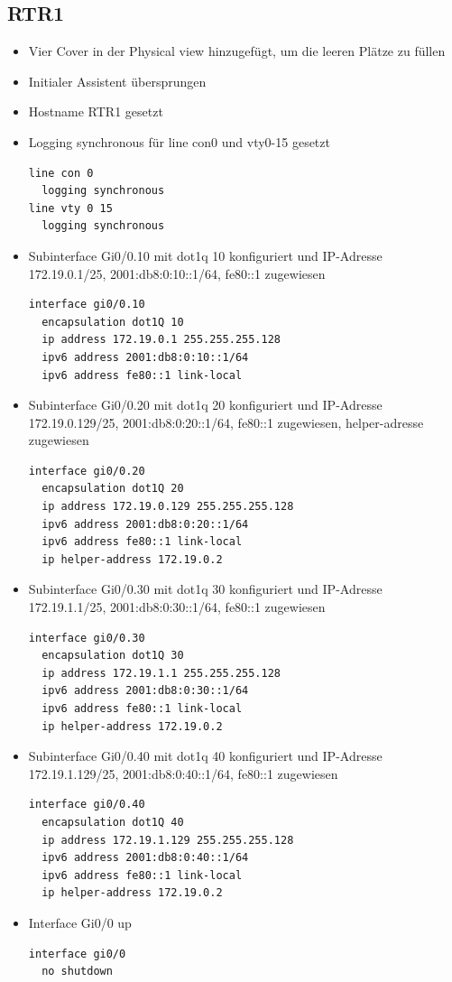 \documentclass[11pt]{article}
\begin{document}
\subsection{RTR1}
\label{sec:org4ee8349}
\begin{itemize}
\item Vier Cover in der Physical view hinzugefügt, um die leeren Plätze zu füllen
\item Initialer Assistent übersprungen
\item Hostname RTR1 gesetzt
\item Logging synchronous für line con0 und vty0-15 gesetzt
\begin{verbatim}
line con 0
  logging synchronous
line vty 0 15
  logging synchronous
\end{verbatim}
\item Subinterface Gi0/0.10 mit dot1q 10 konfiguriert und IP-Adresse 172.19.0.1/25, 2001:db8:0:10::1/64, fe80::1 zugewiesen
\begin{verbatim}
interface gi0/0.10
  encapsulation dot1Q 10
  ip address 172.19.0.1 255.255.255.128
  ipv6 address 2001:db8:0:10::1/64
  ipv6 address fe80::1 link-local
\end{verbatim}
\item Subinterface Gi0/0.20 mit dot1q 20 konfiguriert und IP-Adresse 172.19.0.129/25, 2001:db8:0:20::1/64, fe80::1 zugewiesen, helper-adresse zugewiesen
\begin{verbatim}
interface gi0/0.20
  encapsulation dot1Q 20
  ip address 172.19.0.129 255.255.255.128
  ipv6 address 2001:db8:0:20::1/64
  ipv6 address fe80::1 link-local
  ip helper-address 172.19.0.2
\end{verbatim}
\item Subinterface Gi0/0.30 mit dot1q 30 konfiguriert und IP-Adresse 172.19.1.1/25, 2001:db8:0:30::1/64, fe80::1 zugewiesen
\begin{verbatim}
interface gi0/0.30
  encapsulation dot1Q 30
  ip address 172.19.1.1 255.255.255.128
  ipv6 address 2001:db8:0:30::1/64
  ipv6 address fe80::1 link-local
  ip helper-address 172.19.0.2
\end{verbatim}
\item Subinterface Gi0/0.40 mit dot1q 40 konfiguriert und IP-Adresse 172.19.1.129/25, 2001:db8:0:40::1/64, fe80::1 zugewiesen
\begin{verbatim}
interface gi0/0.40
  encapsulation dot1Q 40
  ip address 172.19.1.129 255.255.255.128
  ipv6 address 2001:db8:0:40::1/64
  ipv6 address fe80::1 link-local
  ip helper-address 172.19.0.2
\end{verbatim}
\item Interface Gi0/0 up
\begin{verbatim}
interface gi0/0
  no shutdown
\end{verbatim}
\end{itemize}
\end{document}
